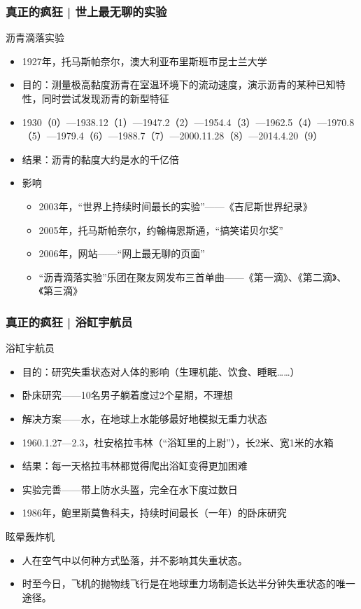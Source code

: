\begin{frame}
  \frametitle{真正的疯狂 | 世上最无聊的实验}
  \begin{block}{沥青滴落实验}
    \begin{itemize}
      \item 1927年，托马斯\textbullet 帕奈尔，澳大利亚布里斯班市昆士兰大学
      \item 目的：测量极高黏度沥青在室温环境下的流动速度，演示沥青的某种已知特性，同时尝试发现沥青的新型特征
      \pause
      \item 1930（0）—1938.12（1）—1947.2（2）—1954.4（3）—1962.5（4）—1970.8（5）—1979.4（6）—1988.7（7）—2000.11.28（8）—2014.4.20（9）
      \item 结果：沥青的黏度大约是水的千亿倍
      \item 影响
        \begin{itemize}
          \item 2003年，“世界上持续时间最长的实验”——《吉尼斯世界纪录》
          \item 2005年，托马斯\textbullet 帕奈尔，约翰\textbullet 梅恩斯通，“搞笑诺贝尔奖”
          \item 2006年，网站——“网上最无聊的页面”
          \item “沥青滴落实验”乐团在聚友网发布三首单曲——《第一滴》、《第二滴》、《第三滴》
        \end{itemize}
    \end{itemize}
  \end{block}
\end{frame}

\begin{frame}
  \frametitle{真正的疯狂 | 浴缸宇航员}
  \begin{block}{浴缸宇航员}
    \begin{itemize}
      \item 目的：研究失重状态对人体的影响（生理机能、饮食、睡眠……）
    \pause
      \item 卧床研究——10名男子躺着度过2个星期，不理想
      \item 解决方案——水，在地球上水能够最好地模拟无重力状态
      \item 1960.1.27—2.3，杜安\textbullet 格拉韦林（“浴缸里的上尉”），长2米、宽1米的水箱
      \item 结果：每一天格拉韦林都觉得爬出浴缸变得更加困难
      \item 实验完善——带上防水头盔，完全在水下度过数日
      \item 1986年，鲍里斯\textbullet 莫鲁科夫，持续时间最长（一年）的卧床研究
    \end{itemize}
  \end{block}
  \pause
  \begin{block}{眩晕轰炸机}
    \begin{itemize}
      \item 人在空气中以何种方式坠落，并不影响其失重状态。
      \item 时至今日，飞机的抛物线飞行是在地球重力场制造长达半分钟失重状态的唯一途径。
    \end{itemize}
  \end{block}
\end{frame}

